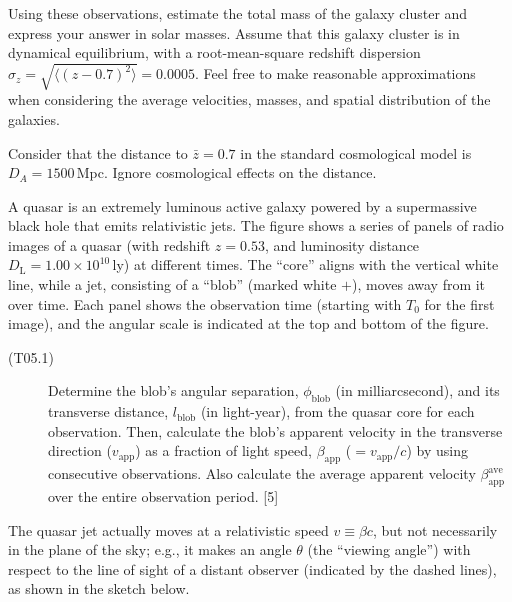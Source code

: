 
Using these observations, estimate the total mass of the galaxy cluster and
express your answer in solar masses. Assume that this galaxy cluster is in
dynamical equilibrium, with a root-mean-square redshift dispersion
$\sigma_z = \sqrt{\langle (z - 0.7)^2 \rangle} = 0.0005$. Feel free to make
reasonable approximations when considering the average velocities, masses, and
spatial distribution of the galaxies.

Consider that the distance to $\bar{z} = 0.7$ in the standard cosmological
model is $D_A = 1500$\,Mpc. Ignore cosmological effects on the distance.

A quasar is an extremely luminous active galaxy powered by a supermassive
black hole that emits relativistic jets. The figure shows a series of panels
of radio images of a quasar (with redshift $z = 0.53$, and luminosity distance
$D_{\mathrm{L}} = 1.00 \times 10^{10}$\,ly) at different times. The ``core''
aligns with the vertical white line, while a jet, consisting of a ``blob''
(marked white $+$), moves away from it over time. Each panel shows the
observation time (starting with $T_0$ for the first image), and the angular
scale is indicated at the top and bottom of the figure.


\begin{description}
\item[(T05.1)] Determine the blob's angular separation, $\phi_{\mathrm{blob}}$
  (in milliarcsecond), and its transverse distance, $l_{\mathrm{blob}}$ (in
  light-year), from the quasar core for each observation. Then, calculate the
  blob's apparent velocity in the transverse direction ($v_{\mathrm{app}}$) as
  a fraction of light speed, $\beta_{\mathrm{app}}$
  ($= v_{\mathrm{app}}/c$) by using consecutive observations. Also calculate
  the average apparent velocity $\beta_{\mathrm{app}}^{\mathrm{ave}}$ over the
  entire observation period. \hfill[5]
\end{description}

The quasar jet actually moves at a relativistic speed $v \equiv \beta c$, but
not necessarily in the plane of the sky; e.g., it makes an angle $\theta$ (the
``viewing angle'') with respect to the line of sight of a distant observer
(indicated by the dashed lines), as shown in the sketch below.

